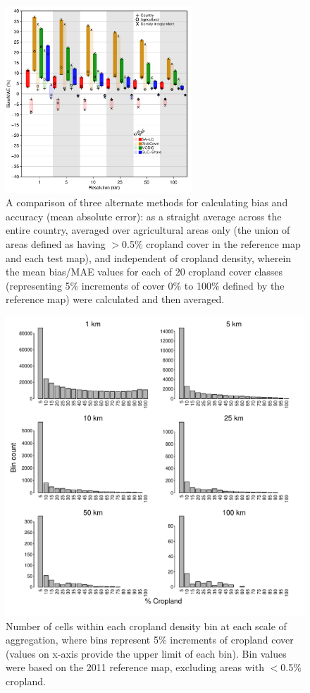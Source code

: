 \documentclass[12pt, titlepage]{article}
\begin{document}
\begin{figure}[!ht]
  \centering
     \includegraphics[width = 7cm]{figures/cropland_bias_region.pdf} 
      \caption{A comparison of three alternate methods for calculating bias and accuracy (mean absolute error): as a straight average across the entire country, averaged over agricultural areas only (the union of areas defined as having $>$0.5\% cropland cover in the reference map and each test map), and independent of cropland density, wherein the mean bias/MAE values for each of 20 cropland cover classes (representing 5\% increments of cover 0\% to 100\% defined by the reference map) were calculated and then averaged.}
      \label{fig:biasregion}
\end{figure}

%
%

\begin{figure}[!ht]
  \centering
     \includegraphics[width = 12cm]{figures/cropland_bins.pdf} 
      \caption{Number of cells within each cropland density bin at each scale of aggregation, where bins represent 5\% increments of cropland cover (values on x-axis provide the upper limit of each bin). Bin values were based on the 2011 reference map, excluding areas with $<$0.5\% cropland.}
      \label{fig:cropbins}
\end{figure}
\end{document}
